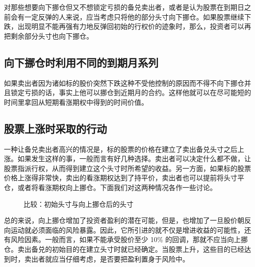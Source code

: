 对那些想要向下挪仓但又不想锁定亏损的备兑卖出者，或者是认为股票在到期日之前会有一定反弹的人来说，应当考虑只将他的部分头寸向下挪仓。如果股票继续下跌，出现明显不能再强有力地反弹回初始的行权价的迹象时，那么，投资者可以再把剩余部分头寸也向下挪仓。

\subsection{向下挪仓时利用不同的到期月系列}
如果卖出者因为诸如标的股价突然下跌这种不受他控制的原因而不得不向下挪仓并且锁定亏损的话，事实上他可以挪仓到近期月的合约。这样他就可以在尽可能短的时间里拿回从短期看涨期权中得到的时间价值。
\subsection{股票上涨时采取的行动}
一种让备兑卖出者高兴的情况是，标的股票的价格在建立了卖出备兑头寸之后上涨。如果发生这样的事，一般而言有好几种选择。卖出者可以决定什么都不做，让股票指派行权，从而得到建立这个头寸时所希望的收益。另一方面，如果标的股票价格上涨得非常快，卖出的看涨期权达到了持平价，卖出者也可以提前将头寸平仓，或者将看涨期权向上挪仓。下面我们对这两种情况各作一些讨论。

\begin{figure}
    \centering
    \caption{比较：初始头寸与向上挪仓后的头寸}
    \label{fig2.4}
\end{figure}

总的来说，向上挪仓增加了投资者盈利的潜在可能，但是，也增加了一旦股价朝反向运动就必须面临的风险暴露。因此，它所引进的就不仅是增进收益的可能性，还有风险因素。一般而言，如果不能承受股价至少 10\% 的回调，那就不应当向上挪仓。卖出备兑的初始目的在建立头寸时就已经确定。当股票上升，这些目的已经达到时，卖出者就应当仔细考虑，是否要把盈利置身于风险中。
